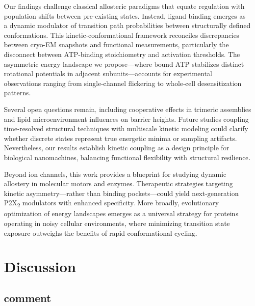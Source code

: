 \documentclass[a4paper,12pt]{article}
\begin{document}
	Our findings challenge classical allosteric paradigms that equate regulation with population shifts between pre-existing states. Instead, ligand binding emerges as a dynamic modulator of transition path probabilities between structurally defined conformations. This kinetic-conformational framework reconciles discrepancies between cryo-EM snapshots and functional measurements, particularly the disconnect between ATP-binding stoichiometry and activation thresholds. The asymmetric energy landscape we propose—where bound ATP stabilizes distinct rotational potentials in adjacent subunits—accounts for experimental observations ranging from single-channel flickering to whole-cell desensitization patterns.
	
	Several open questions remain, including cooperative effects in trimeric assemblies and lipid microenvironment influences on barrier heights. Future studies coupling time-resolved structural techniques with multiscale kinetic modeling could clarify whether discrete states represent true energetic minima or sampling artifacts. Nevertheless, our results establish kinetic coupling as a design principle for biological nanomachines, balancing functional flexibility with structural resilience.
	
	Beyond ion channels, this work provides a blueprint for studying dynamic allostery in molecular motors and enzymes. Therapeutic strategies targeting kinetic asymmetry—rather than binding pockets—could yield next-generation P2X\textsubscript{2} modulators with enhanced specificity. More broadly, evolutionary optimization of energy landscapes emerges as a universal strategy for proteins operating in noisy cellular environments, where minimizing transition state exposure outweighs the benefits of rapid conformational cycling.
	
	\section{Discussion}
	\subsection{comment}
\end{document}
